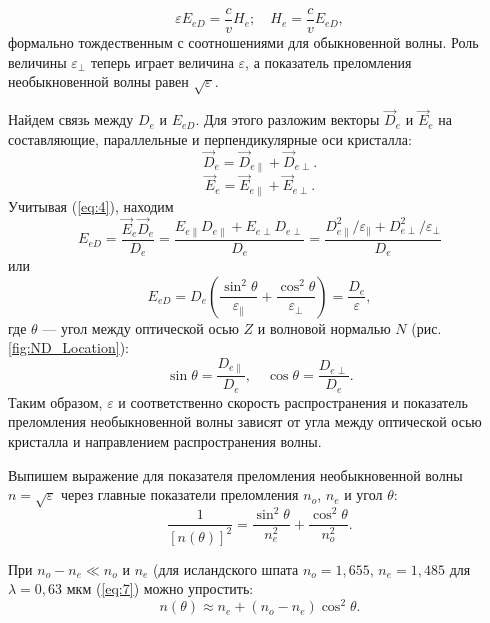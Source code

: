 \documentclass[a4paper, 12pt]{article}
\begin{document}
	\begin{equation}
		\varepsilon E_{eD}=\frac{c}{v}H_e;\quad H_e=\frac{c}{v}E_{eD},
	\end{equation}
	формально тождественным с соотношениями для обыкновенной волны. Роль величины $\varepsilon_\perp$ теперь играет величина $\varepsilon$, а показатель преломления необыкновенной волны равен $\sqrt{\varepsilon}$.\par
	Найдем связь между $D_e$ и $E_{eD}$. Для этого разложим векторы $\vec{D}_e$ и $\vec{E}_e$ на составляющие, параллельные и перпендикулярные оси кристалла:
	\begin{equation}
		\vec{D}_e=\vec{D}_{e\parallel}+\vec{D}_{e\perp}.
	\end{equation}
	\begin{equation}
		\vec{E}_e=\vec{E}_{e\parallel}+\vec{E}_{e\perp}.
	\end{equation}
	Учитывая (\ref{eq:4}), находим
	\begin{equation}
		E_{eD}=\frac{\vec{E}_e\vec{D}_e}{D_e}=\frac{E_{e\parallel}D_{e\parallel}+E_{e\perp}D_{e\perp}}{D_e}=\frac{D_{e\parallel}^2/\varepsilon_\parallel+D_{e\perp}^2/\varepsilon_\perp}{D_e}
	\end{equation}
	или
	\begin{equation}
		E_{eD}=D_e\left(\frac{\sin^2\theta}{\varepsilon_\parallel}+\frac{\cos^2\theta}{\varepsilon_\perp}\right)=\frac{D_e}{\varepsilon},
	\end{equation}
	где $\theta$ — угол между оптической осью $Z$ и волновой нормалью $N$ (рис. \ref{fig:ND_Location}):
	\begin{equation}
		\sin\theta=\frac{D_{e\parallel}}{D_e},\quad\cos\theta=\frac{D_{e\perp}}{D_e}.
	\end{equation}
	Таким образом, $\varepsilon$ и соответственно скорость распространения и показатель преломления необыкновенной волны зависят от угла между оптической осью кристалла и направлением распространения волны.\par
	Выпишем выражение для показателя преломления необыкновенной волны $n=\sqrt{\varepsilon}$ через главные показатели преломления $n_o$, $n_e$ и угол $\theta$:
	\begin{equation}
		\frac{1}{\left[n\left(\theta\right)\right]^2}=\frac{\sin^2\theta}{n_e^2}+\frac{\cos^2\theta}{n_o^2}.
		\label{eq:7}
	\end{equation}
	\par
	При $n_o-n_e\ll n_o$ и $n_e$  (для исландского шпата $n_o=1,655$, $n_e=1,485$ для $\lambda=0,63\text{ мкм}$ (\ref{eq:7}) можно упростить:
	\begin{equation}
		n\left(\theta\right)\approx n_e+\left(n_o-n_e\right)\cos^2\theta.
	\end{equation}
\end{document}
